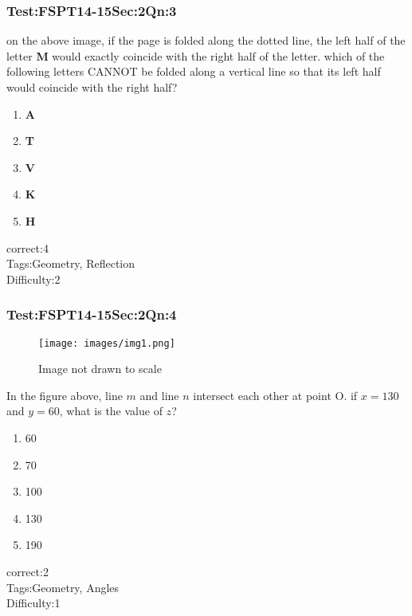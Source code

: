 \documentclass[]{beamer}
\begin{document}
    \begin{frame}
	    \frametitle{Test:FSPT14-15\hspace{2mm}Sec:2\hspace{2mm}Qn:3}
on the above image, if the page is folded along the dotted line, the left half of the letter \textbf{M} would exactly coincide with the right half of the letter. which of the following letters CANNOT be folded along a vertical line so that its left half would coincide with the right half?	       
	    \begin{enumerate}
	        \item
	            \textbf{A}
	        \item
	            \textbf{T}
	        \item
	            \textbf{V}
	        \item
	            \textbf{K}
	        \item
	            \textbf{H}
	    \end{enumerate}
	    correct:4  \\   
	    Tags:Geometry, Reflection    \\
	    Difficulty:2   \\
    \end{frame}
    \begin{frame}
	    \frametitle{Test:FSPT14-15\hspace{2mm}Sec:2\hspace{2mm}Qn:4}
		\begin{figure}
			\begin{center}
				\texttt{[image: images/img1.png]}
	    	\end{center}
  			{Image not drawn to scale}
		\end{figure}	    
	    In the figure above, line $m$ and line $n$ intersect each other at point O. if $x=130$ and $y=60$, what is the value of $z$?
	    \begin{enumerate}
	        \item
	            60
	        \item
	            70
	        \item
	            100
	        \item
	            130
	        \item
	            190
	    \end{enumerate}
	    correct:2  \\   
	    Tags:Geometry, Angles    \\
	    Difficulty:1   \\
    \end{frame}
\end{document}
